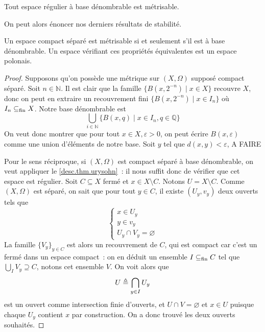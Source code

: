 \begin{theorem}\label{desc.thm.urysohn}
  Tout espace régulier à base dénombrable est métrisable.
\end{theorem}

On peut alors énoncer nos derniers résultats de stabilité.

\begin{proposition}\label{desc.prop.second}
  Un espace compact séparé est métrisable si et seulement s'il est à base
  dénombrable. Un espace vérifiant ces propriétés équivalentes est un espace
  polonais.
\end{proposition}

\begin{proof}
  Supposons qu'on possède une métrique sur $(X,\Omega)$ supposé compact séparé.
  Soit $n\in \mathbb N$. Il est clair que la famille
  $\{B(x,2^{-n})\mid x \in X\}$ recouvre $X$, donc on peut en extraire un
  recouvrement fini $\{B(x,2^{-n})\mid x \in I_n\}$ où $I_n\subseteq_{\mathrm{fin}} X$. Notre
  base dénombrable est
  \[\bigcup_{i\in \mathbb N} \{B(x,q)\mid x \in I_n, q \in \mathbb Q\}\]
  On veut donc montrer que pour tout $x\in X, \varepsilon > 0$, on peut écrire
  $B(x,\varepsilon)$ comme une union d'éléments de notre base. Soit $y$ tel que
  $d(x,y) < \varepsilon$, A FAIRE

  Pour le sens réciproque, si $(X,\Omega)$ est compact séparé à base
  dénombrable, on veut appliquer le \cref{desc.thm.urysohn}~: il nous suffit
  donc de vérifier que cet espace est régulier. Soit $C\subseteq X$ fermé et
  $x\in X \setminus C$. Notons $U = X \setminus C$. Comme $(X,\Omega)$ est
  séparé, on sait que pour tout $y \in C$, il existe $(U_y,v_y)$ deux ouverts
  tels que
  \[\left\{\begin{array}{c}
  x \in U_y\\
  y \in v_y\\
  U_y \cap V_y = \varnothing
  \end{array}\right.\]
  La famille $\{V_y\}_{y \in C}$ est alors un recouvrement de $C$, qui est
  compact car c'est un fermé dans un espace compact~: on en déduit un ensemble
  $I\subseteq_{\mathrm{fin}} C$ tel que $\bigcup_I V_y \supseteq C$, notons cet ensemble $V$.
  On voit alors que
  \[U \triangleq \bigcap_{y\in I} U_y\]
  est un ouvert comme intersection finie d'ouverts, et $U\cap V = \varnothing$
  et $x \in U$ puisque chaque $U_y$ contient $x$ par construction. On a donc
  trouvé les deux ouverts souhaités.


\end{proof}
